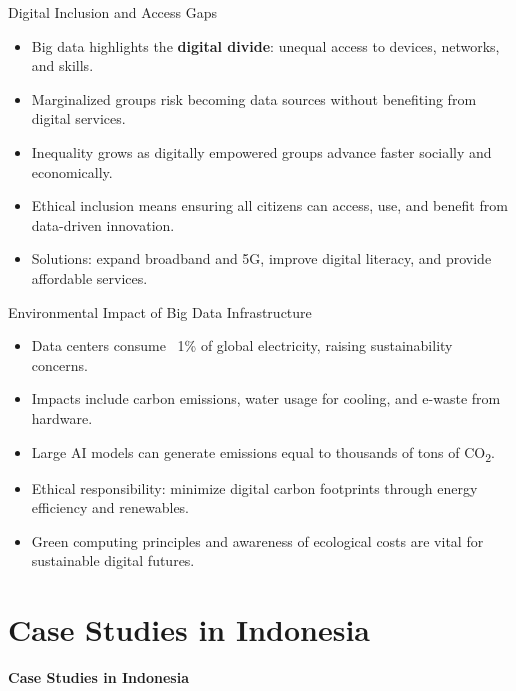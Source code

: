 \documentclass[aspectratio=169, table]{beamer}
\begin{document}
\begin{frame}{Digital Inclusion and Access Gaps}
	\vspace{20pt}
	\begin{itemize}
		\item Big data highlights the \textbf{digital divide}: unequal access to devices, networks, and skills.  
		\item Marginalized groups risk becoming data sources without benefiting from digital services.  
		\item Inequality grows as digitally empowered groups advance faster socially and economically.  
		\item Ethical inclusion means ensuring all citizens can access, use, and benefit from data-driven innovation.  
		\item Solutions: expand broadband and 5G, improve digital literacy, and provide affordable services.  
	\end{itemize}
\end{frame}

\begin{frame}{\LARGE{Environmental Impact of Big Data Infrastructure}}
	\vspace{20pt}
	\begin{itemize}
		\item Data centers consume ~1\% of global electricity, raising sustainability concerns.  
		\item Impacts include carbon emissions, water usage for cooling, and e-waste from hardware.  
		\item Large AI models can generate emissions equal to thousands of tons of CO\textsubscript{2}.  
		\item Ethical responsibility: minimize digital carbon footprints through energy efficiency and renewables.  
		\item Green computing principles and awareness of ecological costs are vital for sustainable digital futures.  
	\end{itemize}
\end{frame}

\section{Case Studies in Indonesia}

\begin{frame}{\hfill}
	\centering
	\Huge{\textbf{Case Studies in Indonesia}}
\end{frame}
\end{document}
